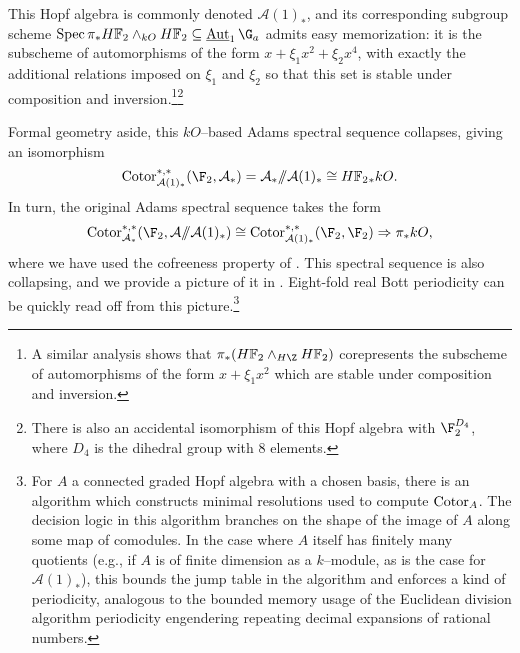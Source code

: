 \begin{example}
\begin{center}
\end{center}
This Hopf algebra is commonly denoted \(\mathcal A(1)_*\), and its corresponding subgroup scheme \(\Spec \pi_* \HFtwo \sm_{kO} \HFtwo \subseteq \InternalAut_1 \G_a\) admits easy memorization: it is the subscheme of automorphisms of the form \(x + \xi_1 x^2 + \xi_2 x^4\), with exactly the additional relations imposed on \(\xi_1\) and \(\xi_2\) so that this set is stable under composition and inversion.\footnote{A similar analysis shows that \(\pi_* (\HFtwo \wedge_{H\Z} \HFtwo)\) corepresents the subscheme of automorphisms of the form \(x + \xi_1 x^2\) which are stable under composition and inversion.}\footnote{There is also an accidental isomorphism of this Hopf algebra with \(\F_2^{D_4}\), where \(D_4\) is the dihedral group with \(8\) elements.}

Formal geometry aside, this \(kO\)--based Adams spectral sequence collapses, giving an isomorphism \[\Cotor^{*, *}_{\mathcal A(1)_*}(\F_2, \mathcal A_*) = \mathcal A_* \mmod \mathcal A(1)_* \cong \HFtwo_* kO.\]  In turn, the original Adams spectral sequence takes the form \[\Cotor^{*, *}_{\mathcal A_*}(\F_2, \mathcal A \mmod \mathcal A(1)_*) \cong \Cotor^{*, *}_{\mathcal A(1)_*}(\F_2, \F_2) \Rightarrow \pi_* kO,\] where we have used the cofreeness property of .  This spectral sequence is also collapsing, and we provide a picture of it in .  Eight-fold real Bott periodicity can be quickly read off from this picture.\footnote{For \(A\) a connected graded Hopf algebra with a chosen basis, there is an algorithm which constructs minimal resolutions used to compute \(\operatorname{Cotor}_A\).  The decision logic in this algorithm branches on the shape of the image of \(A\) along some map of comodules.  In the case where \(A\) itself has finitely many quotients (e.g., if \(A\) is of finite dimension as a \(k\)--module, as is the case for \(\mathcal A(1)_*\)), this bounds the jump table in the algorithm and enforces a kind of periodicity, analogous to the bounded memory usage of the Euclidean division algorithm periodicity engendering repeating decimal expansions of rational numbers.}
\end{example}

